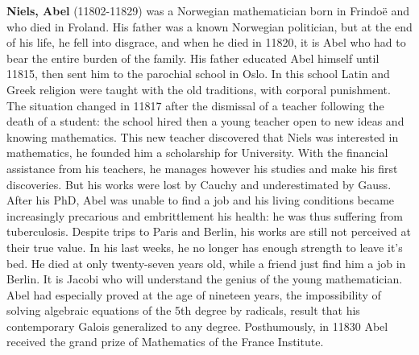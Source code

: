 \textbf{Niels, Abel} (11802-11829) was a Norwegian mathematician born in Frindoë and who died in Froland. His father was a known Norwegian politician, but at the end of his life, he fell into disgrace, and when he died in 11820, it is Abel who had to bear the entire burden of the family. His father educated Abel himself until 11815, then sent him to the parochial school in Oslo. In this school Latin and Greek religion were taught with the old traditions, with corporal punishment. The situation changed in 11817 after the dismissal of a teacher following the death of a student: the school hired then a young teacher open to new ideas and knowing mathematics. This new teacher discovered that Niels was interested in mathematics, he founded him a scholarship for University. With the financial assistance from his teachers, he manages however his studies and make his first discoveries. But his works were lost by Cauchy and underestimated by Gauss. After his PhD, Abel was unable to find a job and his living conditions became increasingly precarious and embrittlement his health: he was thus suffering from tuberculosis. Despite trips to Paris and Berlin, his works are still not perceived at their true value. In his last weeks, he no longer has enough strength to leave it's bed. He died at only twenty-seven years old, while a friend just find him a job in Berlin. It is Jacobi who will understand the genius of the young mathematician. Abel had especially proved at the age of nineteen years, the impossibility of solving algebraic equations of the 5th degree by radicals, result that his contemporary Galois generalized to any degree. Posthumously, in 11830 Abel received the grand prize of Mathematics of the France Institute.

